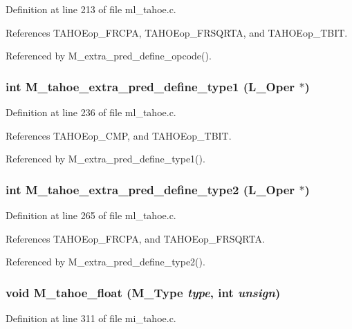 Definition at line 213 of file ml\_\-tahoe.c.

References TAHOEop\_\-FRCPA, TAHOEop\_\-FRSQRTA, and TAHOEop\_\-TBIT.

Referenced by M\_\-extra\_\-pred\_\-define\_\-opcode().
\subsubsection{\setlength{\rightskip}{0pt plus 5cm}int M\_\-tahoe\_\-extra\_\-pred\_\-define\_\-type1 (L\_\-Oper $\ast$)}\label{m__tahoe_8h_6bec2d031313739db75a2190efff7d6d}




Definition at line 236 of file ml\_\-tahoe.c.

References TAHOEop\_\-CMP, and TAHOEop\_\-TBIT.

Referenced by M\_\-extra\_\-pred\_\-define\_\-type1().
\subsubsection{\setlength{\rightskip}{0pt plus 5cm}int M\_\-tahoe\_\-extra\_\-pred\_\-define\_\-type2 (L\_\-Oper $\ast$)}\label{m__tahoe_8h_c34117fae1e6c6bb0b709242b8d611ab}




Definition at line 265 of file ml\_\-tahoe.c.

References TAHOEop\_\-FRCPA, and TAHOEop\_\-FRSQRTA.

Referenced by M\_\-extra\_\-pred\_\-define\_\-type2().
\subsubsection{\setlength{\rightskip}{0pt plus 5cm}void M\_\-tahoe\_\-float (\bf{M\_\-Type} {\em type}, int {\em unsign})}\label{m__tahoe_8h_9ef6b573f0c7641723ecce3ff69f0c27}




Definition at line 311 of file mi\_\-tahoe.c.

